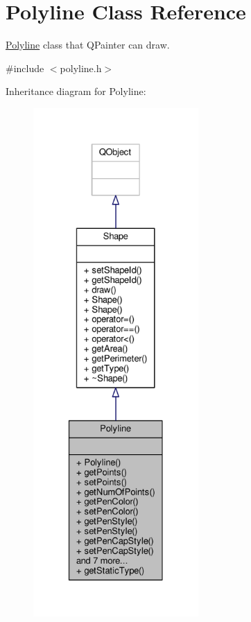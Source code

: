 \hypertarget{classPolyline}{}\section{Polyline Class Reference}
\label{classPolyline}


\hyperlink{classPolyline}{Polyline} class that Q\+Painter can draw.  




{\ttfamily \#include $<$polyline.\+h$>$}



Inheritance diagram for Polyline\+:\nopagebreak
\begin{figure}[H]
\begin{center}
\leavevmode
\includegraphics[height=550pt]{classPolyline__inherit__graph}
\end{center}
\end{figure}


